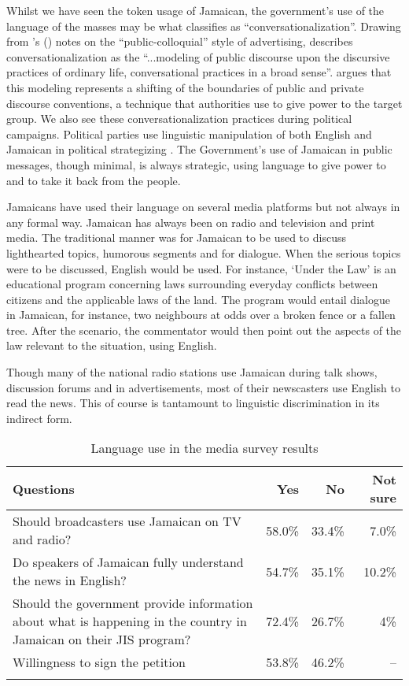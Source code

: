 \documentclass[output=paper,colorlinks,citecolor=brown]{langscibook}
\begin{document}
Whilst we have seen the token usage of Jamaican, the government’s use of the language of the masses may be what \citet{Fairclough1994} classifies as “conversationalization”. Drawing from \citeauthor{Leech1966}’s (\citeyear{Leech1966}) notes on the “public-colloquial” style of advertising, \citet[242]{Fairclough1994} describes conversationalization as the “...modeling of public discourse upon the discursive practices of ordinary life, conversational practices in a broad sense”. \citet{Fairclough1994} argues that this modeling represents a shifting of the boundaries of public and private discourse conventions, a technique that authorities use to give power to the target group. We also see these conversationalization practices during political campaigns. Political parties use linguistic manipulation of both English and Jamaican in political strategizing \citep{Francis2010}. The Government’s use of Jamaican in public messages, though minimal, is always strategic, using language to give power to and to take it back from the people.

Jamaicans have used their language on several media platforms but not always in any formal way. Jamaican has always been on radio and television and print media. The traditional manner was for Jamaican to be used to discuss lighthearted topics, humorous segments and for dialogue. When the serious topics were to be discussed, English would be used. For instance, ‘Under the Law' is an educational program concerning laws surrounding everyday conflicts between citizens and the applicable laws of the land. The program would entail dialogue in Jamaican, for instance, two neighbours at odds over a broken fence or a fallen tree. After the scenario, the commentator would then point out the aspects of the law relevant to the situation, using English.

Though many of the national radio stations use Jamaican during talk shows, discussion forums and in advertisements, most of their newscasters use English to read the news. This of course is tantamount to linguistic discrimination in its indirect form. 

\begin{table}
\caption{Language use in the media survey results\label{tab:02:3}}
\begin{tabularx}{\textwidth}{Qrrr}
    \lsptoprule
    {Questions} & {Yes} & {No} & {Not sure}\\\midrule
    Should broadcasters use Jamaican on TV and radio? & 58.0\% & 33.4\% & 7.0\%\\
    \tablevspace
    Do speakers of Jamaican fully understand the news in English? & 54.7\% & 35.1\% & 10.2\%\\
    \tablevspace
    Should the government provide information about what is happening in the country in Jamaican on their JIS program? & 72.4\% & 26.7\% & 4\%\\
    \tablevspace
    Willingness to sign the petition & 53.8\% & 46.2\% & -- \\
    \lspbottomrule
\end{tabularx}
\end{table}
\end{document}
